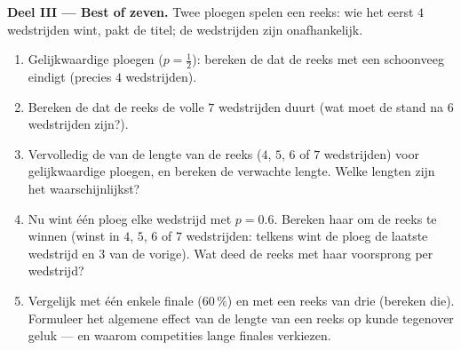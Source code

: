\begin{problem}
\medskip
\noindent\textbf{Deel III --- Best of zeven.}
Twee ploegen spelen een reeks: wie het eerst $4$ wedstrijden wint, pakt de
titel; de wedstrijden zijn onafhankelijk.
\begin{enumerate}[resume]
  \item Gelijkwaardige ploegen ($p = \frac12$): bereken de  dat de reeks
        met een schoonveeg eindigt (precies $4$ wedstrijden).
  \item Bereken de  dat de reeks de volle $7$ wedstrijden duurt (wat moet
        de stand na $6$ wedstrijden zijn?).
  \item Vervolledig de  van de lengte van de reeks ($4$, $5$,
        $6$ of $7$ wedstrijden) voor gelijkwaardige ploegen, en bereken de
        verwachte lengte. Welke lengten zijn het waarschijnlijkst?
  \item Nu wint één ploeg elke wedstrijd met $p = 0.6$. Bereken haar  om
        de reeks te winnen (winst in $4$, $5$, $6$ of $7$ wedstrijden: telkens
        wint de ploeg de laatste wedstrijd en $3$ van de vorige). Wat deed de
        reeks met haar voorsprong per wedstrijd?
  \item Vergelijk met één enkele finale ($60\,\%$) en met een reeks van drie
        (bereken die). Formuleer het algemene effect van de lengte van een
        reeks op kunde tegenover geluk --- en waarom competities lange finales
        verkiezen.
\end{enumerate}


\end{problem}
